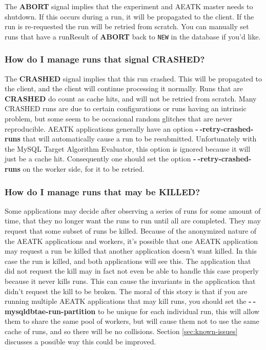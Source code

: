 \documentclass[11pt,letterpaper,oneside]{article}
\begin{document}
The \textbf{ABORT} signal implies that the experiment and AEATK master needs to shutdown. If this occurs during a run, it will be propagated to the client. If the run is re-requested the run will be retried from scratch. You can manually set runs that have a runResult of \textbf{ABORT} back to \texttt{NEW} in the database if you'd like.

\subsubsection{How do I manage runs that signal CRASHED?}

The \textbf{CRASHED} signal implies that this run crashed. This will be propagated to the client, and the client will continue processing it normally. Runs that are \textbf{CRASHED} do count as cache hits, and will not be retried from scratch. Many CRASHED runs are due to certain configurations or runs having an intrinsic problem, but some seem to be occasional random glitches that are never reproducible. AEATK applications generally have an option \textbf{-$~\!$-retry-crashed-runs} that will automatically cause a run to be resubmitted. Unfortunately with the MySQL Target Algorithm Evaluator, this option is ignored because it will just be a cache hit. Consequently one should set the option \textbf{-$~\!$-retry-crashed-runs} on the worker side, for it to be retried. 

\subsubsection{How do I manage runs that may be KILLED?}

Some applications may decide after observing a series of runs for some amount of time, that they no longer want the runs to run until all are completed. They may request that some subset of runs be killed. Because of the anonymized nature of the AEATK applications and workers, it's possible that one AEATK application may request a run be killed that another application doesn't want killed. In this case the run is killed, and both applications will see this. The application that did not request the kill may in fact not even be able to handle this case properly because it never kills runs. This can cause the invariants in the application that didn't request the kill to be broken. The moral of this story is that if you are running multiple AEATK applications that may kill runs, you should set the \textbf{-$~\!$-mysqldbtae-run-partition} to be unique for each individual run, this will allow them to share the same pool of workers, but will cause them not to use the same cache of runs, and so there will be no collisions. Section \ref{sec:known-issues} discusses a possible way this could be improved.
\end{document}
